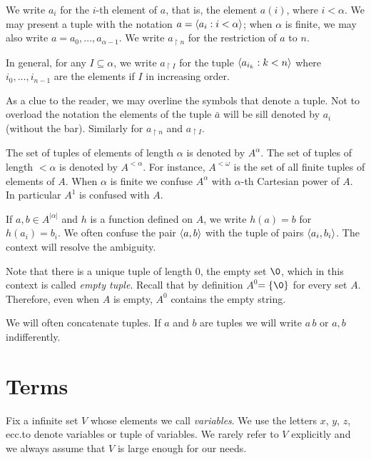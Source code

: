We write \emph{$a_i$} for the $i$-th element of $a$, that is, the element $a(i)$, where $i<\alpha$. We may present a tuple with the notation \emph{$a=\langle a_i: i<\alpha\rangle$}; when $\alpha$ is finite, we may also write \emph{$a=a_0,\dots,a_{\alpha-1}$}. We write \emph{$a_{\restriction n}$} for the restriction of $a$ to $n$. 

\noindent\llap{\textcolor{red}{\Large\danger}\kern1.5ex}In general, for any $I\subseteq\alpha$, we write \emph{$a_{\restriction I}$} for the tuple $\langle a_{i_k}: k<n\rangle$ where $i_0,\dots,i_{n-1}$ are the elements if $I$ in increasing order.

\noindent\llap{\textcolor{red}{\Large\danger}\kern1.5ex}As a clue to the reader, we may overline the symbols that denote a tuple. Not to overload the notation the elements of the tuple \emph{$\bar a$\/} will be sill denoted by $a_i$ (without the bar). Similarly for $a_{\restriction n}$ and $a_{\restriction I}$.

The set of tuples of elements of length $\alpha$ is denoted by \emph{$A^\alpha$}. The set of tuples of length $<\alpha$ is denoted by \emph{$A^{<\alpha}$}. For instance, \emph{$A^{<\omega}$\/} is the set of all finite tuples of elements of $A$. When $\alpha$ is finite we confuse $A^\alpha$ with $\alpha$-th Cartesian power of $A$. In particular $A^1$ is confused with $A$.

If $a,b\in A^{|\alpha|}$ and $h$ is a function defined on $A$, we write $h(a)=b$ for $h(a_i)=b_i$. We often confuse the pair $\langle a,b\rangle$ with the tuple of pairs $\langle a_i,b_i\rangle$. The context will resolve the ambiguity.

Note that there is a unique tuple of length $0$, the empty set $\0$, which in this context is called \emph{empty tuple\/}. Recall that by definition \emph{$A^{0}$\/}$=\{\0\}$ for every set $A$. Therefore, even when $A$ is empty, $A^{0}$ contains the empty string. 

We will often concatenate tuples. If $a$ and $b$ are tuples we will write \emph{$a\,b$\/} or \emph{$a,b$\/} indifferently. 




\section{Terms}\label{terminidef}
Fix a infinite set \emph{$V$\/} whose elements we call \emph{variables}. We use the letters $x$, $y$, $z$, ecc.\@ to denote variables or tuple of variables. We rarely refer to $V$ explicitly and we always assume that $V$ is large enough for our needs.

